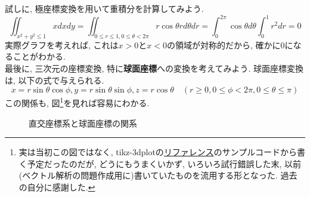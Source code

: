 \documentclass[a4j,dvipdfmx]{jsarticle}
\numberwithin{equation}{section}
\begin{document}
            \clearpage
            試しに, 極座標変換を用いて重積分を計算してみよう.
            \begin{equation*}
                \iint_{x^2+y^2\leq 1}xdxdy=\iint_{0\leq r\leq 1,0\leq\theta<2\pi}r\cos\theta rd\theta dr = \int_{0}^{2\pi}\cos\theta d\theta\int_{0}^{1}r^2dr=0
            \end{equation*}
            実際グラフを考えれば, これは$x>0$と$x<0$の領域が対称的だから, 確かに0になることがわかる.\\

            最後に, 三次元の座標変換, 特に\textbf{球面座標}への変換を考えてみよう. 球面座標変換は, 以下の式で与えられる.
            \begin{equation}
                x=r\sin\theta\cos\phi, y=r\sin\theta\sin\phi, z=r\cos\theta \quad (r\geq 0,0\leq\phi<2\pi,0\leq\theta\leq \pi) \label{eq:多重積分:球面座標変換}
            \end{equation}
            この関係も, 図\footnote{実は当初この図ではなく, tikz-3dplotの\href{https://ctan.math.washington.edu/tex-archive/graphics/pgf/contrib/tikz-3dplot/tikz-3dplot_documentation.pdf}{リファレンス}のサンプルコードから書く予定だったのだが,
            どうにもうまくいかず, いろいろ試行錯誤した末, 以前(ベクトル解析の問題作成用に)書いていたものを流用する形となった. 過去の自分に感謝した.}を見れば容易にわかる.
            \begin{figure}[h]
                \centering
                \caption{直交座標系と球面座標の関系}
            \end{figure}
\end{document}
